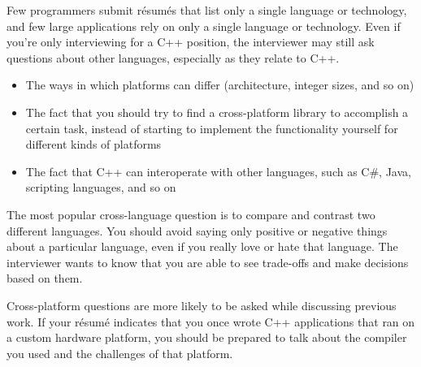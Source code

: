 
Few programmers submit résumés that list only a single language or technology, and few large applications rely on only a single language or technology. Even if you’re only interviewing for a C++ position, the interviewer may still ask questions about other languages, especially as they relate to C++.


\begin{itemize}
\item
The ways in which platforms can differ (architecture, integer sizes, and so on)

\item
The fact that you should try to find a cross-platform library to accomplish a certain task, instead of starting to implement the functionality yourself for different kinds of platforms

\item
The fact that C++ can interoperate with other languages, such as C\#, Java, scripting languages, and so on
\end{itemize}


The most popular cross-language question is to compare and contrast two different languages. You should avoid saying only positive or negative things about a particular language, even if you really love or hate that language. The interviewer wants to know that you are able to see trade-offs and make decisions based on them.

Cross-platform questions are more likely to be asked while discussing previous work. If your résumé indicates that you once wrote C++ applications that ran on a custom hardware platform, you should be prepared to talk about the compiler you used and the challenges of that platform.






